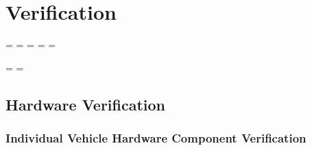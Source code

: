 \documentclass [10pt]{article}
\begin{document}
\section {Verification}











\newpage
\pagestyle{fancy}

\paperwidth=\pdfpageheight
\paperheight=\pdfpagewidth
\pdfpageheight=\paperheight
\pdfpagewidth=\paperwidth
\headwidth=\textheight



\begingroup

\vsize=\textwidth
\hsize=\textheight



\break

\subsection{Hardware Verification}
\subsubsection{Individual Vehicle Hardware Component Verification}
 
\end{document}
